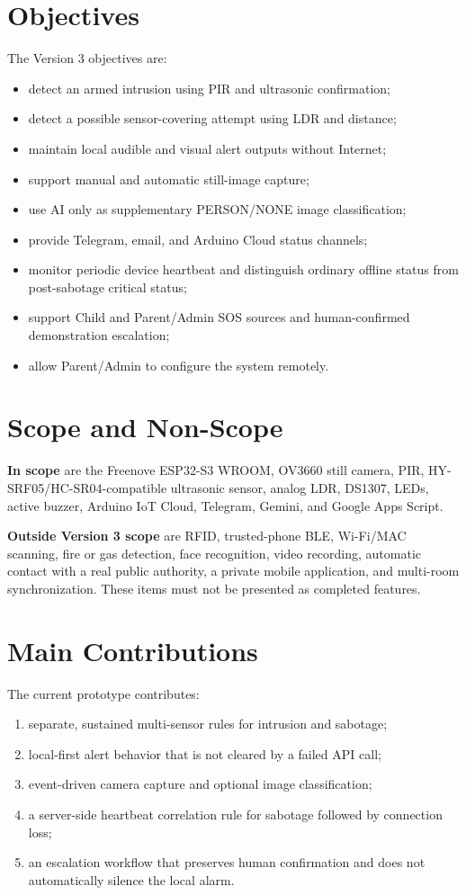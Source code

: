 \documentclass[11pt,a4paper]{report}
\begin{document}
\section{Objectives}
The Version 3 objectives are:
\begin{itemize}
  \item detect an armed intrusion using PIR and ultrasonic confirmation;
  \item detect a possible sensor-covering attempt using LDR and distance;
  \item maintain local audible and visual alert outputs without Internet;
  \item support manual and automatic still-image capture;
  \item use AI only as supplementary PERSON/NONE image classification;
  \item provide Telegram, email, and Arduino Cloud status channels;
  \item monitor periodic device heartbeat and distinguish ordinary offline
        status from post-sabotage critical status;
  \item support Child and Parent/Admin SOS sources and human-confirmed
        demonstration escalation;
  \item allow Parent/Admin to configure the system remotely.
\end{itemize}

\section{Scope and Non-Scope}
\textbf{In scope} are the Freenove ESP32-S3 WROOM, OV3660 still camera, PIR,
HY-SRF05/HC-SR04-compatible ultrasonic sensor, analog LDR, DS1307, LEDs,
active buzzer, Arduino IoT Cloud, Telegram, Gemini, and Google Apps Script.

\textbf{Outside Version 3 scope} are RFID, trusted-phone BLE, Wi-Fi/MAC
scanning, fire or gas detection, face recognition, video recording, automatic
contact with a real public authority, a private mobile application, and
multi-room synchronization. These items must not be presented as completed
features.

\section{Main Contributions}
The current prototype contributes:
\begin{enumerate}
  \item separate, sustained multi-sensor rules for intrusion and sabotage;
  \item local-first alert behavior that is not cleared by a failed API call;
  \item event-driven camera capture and optional image classification;
  \item a server-side heartbeat correlation rule for sabotage followed by
        connection loss;
  \item an escalation workflow that preserves human confirmation and does not
        automatically silence the local alarm.
\end{enumerate}
\end{document}

